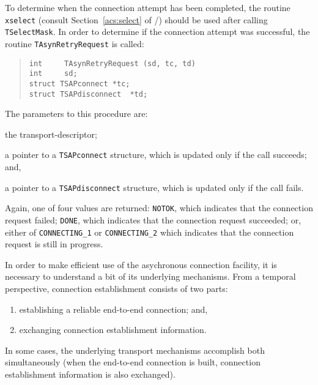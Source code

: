To determine when the connection attempt has been completed,
the routine \verb"xselect" (consult Section~\ref{acs:select} of \volone/)
should be used after calling \verb"TSelectMask".
In order to determine if the connection attempt was successful,
the routine \verb"TAsynRetryRequest" is called:
\begin{quote}\small\begin{verbatim}
int     TAsynRetryRequest (sd, tc, td)
int     sd;
struct TSAPconnect *tc;
struct TSAPdisconnect  *td;
\end{verbatim}\end{quote}
The parameters to this procedure are:
\begin{describe}
\item[\verb"sd":] the transport-descriptor;

\item[\verb"tc":] a pointer to a \verb"TSAPconnect" structure, which is
updated only if the call succeeds;
and,

\item[\verb"td":] a pointer to a \verb"TSAPdisconnect" structure, which is
updated only if the call fails.
\end{describe}
Again, one of four values are returned:
\verb"NOTOK", which indicates that the connection request failed;
\verb"DONE", which indicates that the connection request succeeded;
or, either of \verb"CONNECTING_1" or \verb"CONNECTING_2" which indicates that
the connection request is still in progress.

In order to make efficient use of the asychronous connection facility,
it is necessary to understand a bit of its underlying mechanisms.
From a temporal perspective,
connection establishment consists of two parts:
\begin{enumerate}
\item	establishing a reliable end-to-end connection;
	and,

\item	exchanging connection establishment information.
\end{enumerate}
In some cases,
the underlying transport mechanisms accomplish both simultaneously
(when the end-to-end connection is built,
connection establishment information is also exchanged).

